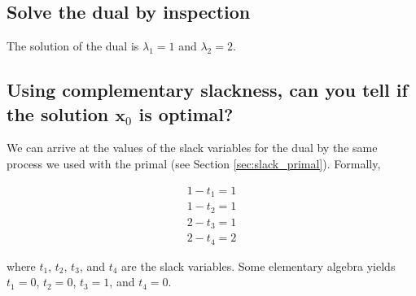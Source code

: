 \documentclass{article}
\begin{document}
\subsection{Solve the dual by inspection}

The solution of the dual is $\lambda_1 = 1$ and $\lambda_2 = 2$.

\subsection{Using complementary slackness, can you tell if the solution $\mathbf{x}_0$ is optimal?}

We can arrive at the values of the slack variables for the dual by the same process we used with the primal (see Section \ref{sec:slack_primal}). Formally,

\begin{align*}
1 - t_1 = 1\\
1 - t_2 = 1\\
2 - t_3 = 1\\
2 - t_4 = 2
\end{align*}

\noindent where $t_1$, $t_2$, $t_3$, and $t_4$ are the slack variables. Some elementary algebra yields $t_1 = 0$, $t_2 = 0$, $t_3 = 1$, and $t_4 = 0$.
\end{document}
